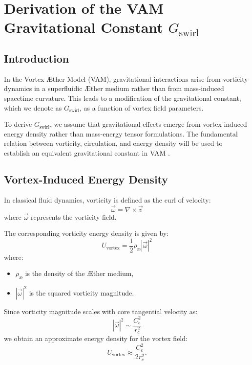 \documentclass[preprint]{revtex4-2}
\begin{document}
    \section*{Derivation of the VAM Gravitational Constant \(  G_\text{swirl} \)}

    \subsection*{Introduction}
    In the Vortex Æther Model (VAM), gravitational interactions arise from vorticity dynamics in a superfluidic Æther medium rather than from mass-induced spacetime curvature. This leads to a modification of the gravitational constant, which we denote as \(  G_\text{swirl} \), as a function of vortex field parameters.

    To derive \(  G_\text{swirl} \), we assume that gravitational effects emerge from vortex-induced energy density rather than mass-energy tensor formulations. The fundamental relation between vorticity, circulation, and energy density will be used to establish an equivalent gravitational constant in VAM \cite{onsager_superfluid, barcelo_superfluid, moffatt_helicity}.

    \subsection*{Vortex-Induced Energy Density}
    In classical fluid dynamics, vorticity is defined as the curl of velocity:
    \begin{equation*}
        \vec{\omega} = \nabla \times \vec{v}
    \end{equation*}
    where \( \vec{\omega} \) represents the vorticity field.

    The corresponding vorticity energy density is given by:
    \begin{equation*}
        U_\text{vortex} = \frac{1}{2} \rho_\text{\ae} |\vec{\omega}|^2
    \end{equation*}
    where:
    \begin{itemize}
        \item \( \rho_\text{\ae} \) is the density of the Æther medium,
        \item \( |\vec{\omega}|^2 \) is the squared vorticity magnitude.
    \end{itemize}

    Since vorticity magnitude scales with core tangential velocity as:
    \begin{equation*}
        |\vec{\omega}|^2 \sim \frac{C_e^2}{r_c^2}
    \end{equation*}
    we obtain an approximate energy density for the vortex field:
    \begin{equation*}
        U_\text{vortex} \approx \frac{C_e^2}{2 r_c^2}.
    \end{equation*}
\end{document}
